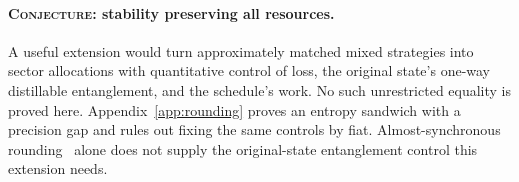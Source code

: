 \paragraph{\textnormal{\textsc{Conjecture}}: stability preserving all resources.}
A useful extension would turn approximately matched mixed strategies into sector allocations with quantitative control of loss, the original state's one-way distillable entanglement, and the schedule's work. No such unrestricted equality is proved here. Appendix~\ref{app:rounding} proves an entropy sandwich with a precision gap and rules out fixing the same controls by fiat. Almost-synchronous rounding~\cite{vidick} alone does not supply the original-state entanglement control this extension needs.

